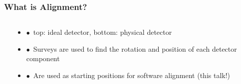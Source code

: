 \documentclass[aspectratio=1610, 12pt]{beamer}
\begin{document}
\begin{frame}\frametitle{What is Alignment?}
  \begin{columns}
    \begin{column}[c]{0.48\textwidth}
      
    \end{column}
    \begin{column}[c]{0.48\textwidth}
      \begin{itemize}
        \item $\bullet$\, top: ideal detector, bottom: physical detector
        \item $\bullet$\, Surveys are used to find the rotation and position of each detector component
        \item $\bullet$\, Are used as starting positions for software alignment (this talk!)
      \end{itemize}
    \end{column}
  \end{columns}
\end{frame}
\end{document}
